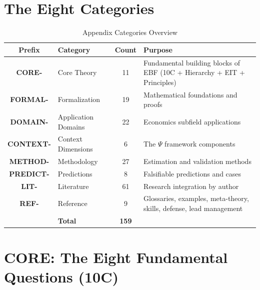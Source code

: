 \section{The Eight Categories}
\label{sec:index-categories}

\begin{table}[htbp]
\centering
\caption{Appendix Categories Overview}
\label{tab:index-categories}
\renewcommand{\arraystretch}{1.4}
\begin{tabular}{@{}clcl@{}}
\toprule
\textbf{Prefix} & \textbf{Category} & \textbf{Count} & \textbf{Purpose} \\
\midrule
\textbf{CORE-} & Core Theory & 11 & Fundamental building blocks of EBF (10C + Hierarchy + EIT + Principles) \\
\textbf{FORMAL-} & Formalization & 19 & Mathematical foundations and proofs \\
\textbf{DOMAIN-} & Application Domains & 22 & Economics subfield applications \\
\textbf{CONTEXT-} & Context Dimensions & 6 & The $\Psi$ framework components \\
\textbf{METHOD-} & Methodology & 27 & Estimation and validation methods \\
\textbf{PREDICT-} & Predictions & 8 & Falsifiable predictions and cases \\
\textbf{LIT-} & Literature & 61 & Research integration by author \\
\textbf{REF-} & Reference & 9 & Glossaries, examples, meta-theory, skills, defense, lead management \\
\midrule
& \textbf{Total} & \textbf{159} & \\
\bottomrule
\end{tabular}
\end{table}

\section{CORE: The Eight Fundamental Questions (10C)}
\label{sec:index-core}

